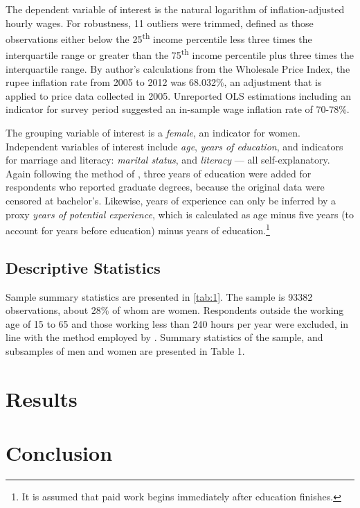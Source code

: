 \documentclass[12pt]{article}
\begin{document}
The dependent variable of interest is the natural logarithm of inflation-adjusted hourly wages. For robustness, 11 outliers were trimmed, defined as those observations either below the 25\textsuperscript{th} income percentile less three times the interquartile range or greater than the 75\textsuperscript{th} income percentile plus three times the interquartile range. By author's calculations from the Wholesale Price Index, the rupee inflation rate from 2005 to 2012 was 68.032\%, an adjustment that is applied to price data collected in 2005. Unreported OLS estimations including an indicator for survey period suggested an in-sample wage inflation rate of 70-78\%.

The grouping variable of interest is a \textit{female}, an indicator for women. Independent variables of interest include \textit{age}, \textit{years of education}, and indicators for marriage and literacy: \textit{marital status}, and \textit{literacy} --- all self-explanatory. Again following the method of \citet{Agrawal2014}, three years of education were added for respondents who reported graduate degrees, because the original data were censored at bachelor's. Likewise, years of experience can only be inferred by a proxy \textit{years of potential experience}, which is calculated as age minus five years (to account for years before education) minus years of education.\footnote{It is assumed that paid work begins immediately after education finishes.}

\subsection{Descriptive Statistics}

Sample summary statistics are presented in \ref{tab:1}. The sample is 93382 observations, about 28\% of whom are women. Respondents outside the working age of 15 to 65 and those working less than 240 hours per year were excluded, in line with the method employed by \citet{Agrawal2014}. Summary statistics of the sample, and subsamples of men and women are presented in Table 1. 

\section{Results
\label{sec:results}}

\section{Conclusion\
\label{sec:conclusion}}
\end{document}

